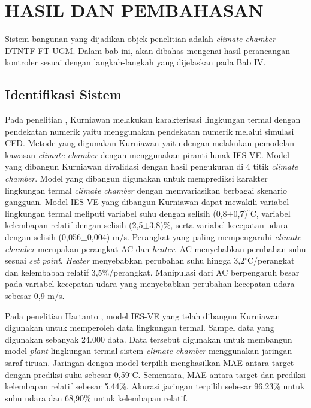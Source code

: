 \chapter{HASIL DAN PEMBAHASAN}
\label{hasil-dan-pembahasan}
Sistem bangunan yang dijadikan objek penelitian adalah \textit{climate chamber} DTNTF FT-UGM. Dalam bab ini, akan dibahas mengenai hasil perancangan kontroler sesuai dengan langkah-langkah yang dijelaskan pada Bab IV.

\section{Identifikasi Sistem}

Pada penelitian \cite{skripsiIchfan}, Kurniawan melakukan karakterisasi lingkungan termal dengan pendekatan numerik yaitu menggunakan pendekatan numerik melalui simulasi CFD. Metode yang digunakan Kurniawan yaitu dengan melakukan pemodelan kawasan \textit{climate chamber} dengan menggunakan piranti lunak IES-VE. Model yang dibangun Kurniawan divalidasi dengan hasil pengukuran di 4 titik \textit{climate chamber}. Model yang dibangun digunakan untuk memprediksi karakter lingkungan termal \textit{climate chamber} dengan memvariasikan berbagai skenario gangguan. Model IES-VE yang dibangun Kurniawan dapat mewakili variabel lingkungan termal meliputi variabel suhu dengan selisih (0,8$\pm$0,7$)^\circ$C, variabel kelembapan relatif dengan selisih (2,5$\pm$3,8)\%, serta variabel kecepatan udara dengan selisih (0,056$\pm$0,004) m/s. Perangkat yang paling mempengaruhi \textit{climate chamber} merupakan perangkat AC dan \textit{heater}. AC menyebabkan perubahan suhu sesuai \textit{set point}. \textit{Heater} menyebabkan perubahan suhu hingga 3,2$^\circ$C/perangkat dan kelembaban relatif 3,5\%/perangkat. Manipulasi dari AC berpengaruh besar pada variabel kecepatan udara yang menyebabkan perubahan kecepatan udara sebesar 0,9 m/s.

Pada penelitian Hartanto \cite{skripsiTanto}, model IES-VE yang telah dibangun Kurniawan digunakan untuk memperoleh data lingkungan termal. Sampel data yang digunakan sebanyak 24.000 data. Data tersebut digunakan untuk membangun model \textit{plant} lingkungan termal sistem \textit{climate chamber} menggunakan jaringan saraf tiruan. Jaringan dengan model terpilih menghasilkan MAE antara target dengan prediksi suhu sebesar 0,59$^\circ$C. Sementara, MAE antara target dan prediksi kelembapan relatif sebesar 5,44\%. Akurasi jaringan terpilih sebesar 96,23\% untuk suhu udara dan 68,90\% untuk kelembapan relatif.

